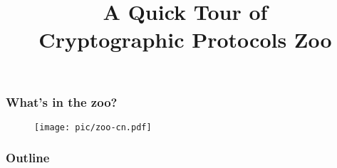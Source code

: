 

\title{A Quick Tour of \\ Cryptographic Protocols Zoo}

 
\maketitle
\begin{frame}\frametitle{What's in the zoo?}
\begin{figure}
\begin{center}
\texttt{[image: pic/zoo-cn.pdf]}
\end{center}
\end{figure}
\end{frame}
\begin{frame}
\frametitle{Outline}
\tableofcontents
\end{frame}
